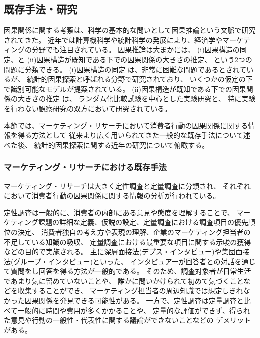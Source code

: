 
\subsection{既存手法・研究}

因果関係に関する考察は、科学の基本的な問いとして因果推論という文脈で研究されてきた。
近年では計算機科学や統計科学の発展により、経済学やマーケティングの分野でも注目されている\cite{Varian2016-se}。
因果推論は大まかには、
(i)因果構造の同定、と
(ii)因果構造が既知である下での因果関係の大きさの推定、
という2つの問題に分類できる。
(i)因果構造の同定 は、非常に困難な問題であるとされているが、
統計的因果探索と呼ばれる分野で研究されており、
いくつかの仮定の下で識別可能なモデルが提案されている\cite{2017-zx}。
(ii)因果構造が既知である下での因果関係の大きさの推定 は、
ランダム化比較試験を中心とした実験研究と、
特に実験を行わない観察研究の双方において研究されている。

本節では、マーケティング・リサーチにおいて消費者行動の因果関係に関する情報を得る方法として
従来より広く用いられてきた一般的な既存手法について述べた後、
統計的因果探索に関する近年の研究について俯瞰する。

\subsubsection{マーケティング・リサーチにおける既存手法}

マーケティング・リサーチは大きく定性調査と定量調査に分類され、
それぞれにおいて消費者行動の因果関係に関する情報の分析が行われている。

定性調査は一般的に、消費者の内部にある意見や態度を理解することで、
マーケティング課題の詳細な定義、仮説の設定、定量調査における調査項目の優先順位の決定、
消費者独自の考え方や表現の理解、企業のマーケティング担当者の不足している知識の吸収、
定量調査における最重要な項目に関する示唆の獲得などの目的で実施される\cite{2018-ci}。
主に深層面接法(デプス・インタビュー)や集団面接法(グループ・インタビュー)といった、
インタビュアーが回答者との対話を通じて質問をし回答を得る方法が一般的である。
そのため、調査対象者が日常生活であまり気に留めていないことや、
誰かに問いかけられて初めて気づくことなどを収集することができ\cite{2018-ci}、
マーケティング担当者の周辺知識では想定しきれなかった因果関係を発見できる可能性がある。
一方で、定性調査は定量調査と比べて一般的に時間や費用が多くかかることや、
定量的な評価ができず、得られた意見や行動の一般性・代表性に関する議論ができないことなどの
デメリットがある。

